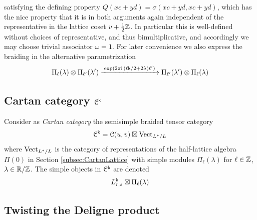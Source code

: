 \documentclass[a4paper, reqno]{amsart}
\theoremstyle{introTheorems}
\newcommand\cC{\mathcal{C}}
\newcommand{\Vect}{\textup{Vect}}
\renewcommand{\1}{\mathbbold{1}}
\begin{document}
satisfying the defining property $Q(xc+yd)=\sigma(xc+yd,xc+yd)$, which has the nice property that it is in both arguments again independent of the representative in the lattice coset $v+\tfrac{1}{2}\mathbb{Z}$. In particular this is well-defined without choices of representative, and thus bimultiplicative, and accordingly  we may choose trivial associator $\omega=1$.
%
For later convenience we also express the braiding in the alternative parametrization 
\[
\Pi_\ell(\lambda)\otimes\Pi_{\ell'}(\lambda')
\xrightarrow{\;\exp(2\pi\mathrm{i}\,(\ell\mathsf{k}/2+2\lambda)\ell')\;}
\Pi_{\ell'}(\lambda')\otimes\Pi_\ell(\lambda)
\]

\subsection{Cartan category \texorpdfstring{$\cC^\k$}{Ck}}\label{subsec:Cartan}



Consider as \emph{Cartan category} the semisimple braided tensor category
$$\cC^\k=\cC(u,v)\boxtimes \Vect_{L^*/L}$$ 
where  %
$\Vect_{L^*/L}$ is the category of representations of the half-lattice algebra $\Pi(0)$ in Section \ref{subsec:CartanLattice} with simple modules $\Pi_\ell(\lambda)$ for $\ell\in\mathbb{Z}$, $\lambda\in \mathbb{R}/\mathbb{Z}$. The simple objects in $\cC^\k$ are denoted 
$$L^{\mathsf{k}}_{r,s}\boxtimes \Pi_\ell(\lambda)$$




\subsection{Twisting the Deligne product}
\end{document}
